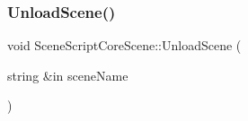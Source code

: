 \hypertarget{class_scene_script_core_scene_abb60f7f26f69b64a2fd6c9e6f7023cfd}{}\label{class_scene_script_core_scene_abb60f7f26f69b64a2fd6c9e6f7023cfd} 
\subsubsection{\texorpdfstring{Unload\+Scene()}{UnloadScene()}}
{\footnotesize\ttfamily void Scene\+Script\+Core\+Scene\+::\+Unload\+Scene (\begin{DoxyParamCaption}\item[{string \&in}]{scene\+Name }\end{DoxyParamCaption})}

